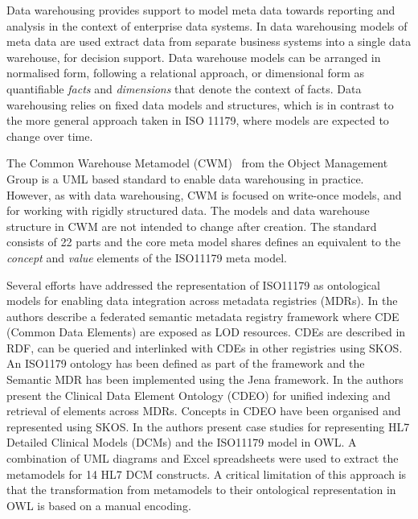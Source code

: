 Data warehousing provides support to model meta data towards reporting and analysis in the context of enterprise data systems. In data warehousing models of meta data are used extract data from separate business systems into a single data warehouse, for decision support. Data warehouse models can be arranged in normalised form, following a relational approach, or dimensional form as quantifiable \emph{facts} and \emph{dimensions} that denote the context of facts. Data warehousing relies on fixed data models and structures, which is in contrast to the more general approach taken in ISO 11179, where models are expected to change over time. 

The Common Warehouse Metamodel (CWM)~\cite{poole03} from the Object Management Group is a UML based standard to enable data warehousing in practice. However, as with data warehousing, CWM is focused on write-once models, and for working with rigidly structured data. The models and data warehouse structure in CWM are not intended to change after creation. The standard consists of 22 parts and the core meta model shares defines an equivalent to the \emph{concept} and \emph{value} elements of the ISO11179 meta model.




Several efforts have addressed the representation of ISO11179 as
ontological models for enabling data integration across metadata
registries (MDRs). In \cite{Sinaci2013784} the authors describe a
federated semantic metadata registry framework where CDE (Common Data
Elements) are exposed as LOD resources. CDEs are described in RDF, can
be queried and interlinked with CDEs in other registries using
SKOS. An ISO1179 ontology has been defined as part of the framework
and the Semantic MDR has been implemented using the Jena framework. In
\cite{pmid25405066} the authors present the Clinical Data Element
Ontology (CDEO) for unified indexing and retrieval of elements across
MDRs. Concepts in CDEO have been organised and represented using
SKOS. In \cite{pmid22211181} the authors present case studies for
representing HL7 Detailed Clinical Models (DCMs) and the ISO11179
model in OWL. A combination of UML diagrams and Excel spreadsheets
were used to extract the metamodels for 14 HL7 DCM constructs. A
critical limitation of this approach is that the transformation from
metamodels to their ontological representation in OWL is based on a
manual encoding.




